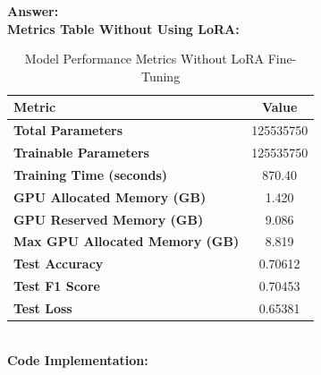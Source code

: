 \documentclass[11pt, oneside]{article}   	%
\begin{document}
\textbf{Answer:} \\
\textbf{Metrics Table Without Using LoRA: }
\\
\begin{table}[h!]
    \centering
    \begin{tabular}{|l|c|}
    \hline
    \textbf{Metric}                            & \textbf{Value}      \\ \hline
    \textbf{Total Parameters}                  & 125535750    \\ \hline
    \textbf{Trainable Parameters}              & 125535750    \\ \hline
    \textbf{Training Time (seconds)}           & 870.40             \\ \hline
    \textbf{GPU Allocated Memory (GB)}         & 1.420              \\ \hline
    \textbf{GPU Reserved Memory (GB)}          & 9.086              \\ \hline
    \textbf{Max GPU Allocated Memory (GB)}     & 8.819              \\ \hline
    \textbf{Test Accuracy}                     & 0.70612            \\ \hline
    \textbf{Test F1 Score}                     & 0.70453           \\ \hline
    \textbf{Test Loss}                         & 0.65381           \\ \hline
    \end{tabular}
    \caption{Model Performance Metrics Without LoRA Fine-Tuning}
\end{table}
\\
\textbf{Code Implementation: }
\end{document}
